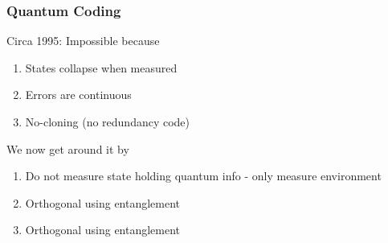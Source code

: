 \subsubsection{Quantum Coding}
Circa 1995: Impossible because
\begin{enumerate}
    \item States collapse when measured
    \item Errors are continuous
    \item No-cloning (no redundancy code)
\end{enumerate}
We now get around it by
\begin{enumerate}
    \item Do not measure state holding quantum info - only measure environment
    \item Orthogonal using entanglement
    \item Orthogonal using entanglement
\end{enumerate}

